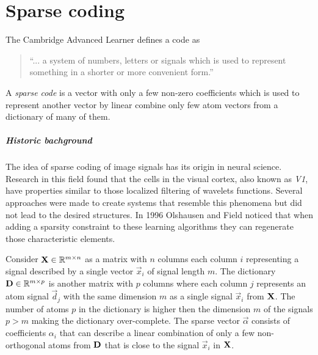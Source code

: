 \chapter{Sparse coding}
\label{chap:sparse_coding}

The Cambridge Advanced Learner defines a code as
\begin{quotation}
``... a system of numbers, letters or signals which is used to represent
something in a shorter or more convenient form.''
\end{quotation}
A \emph{sparse code} is a vector with only a few non-zero coefficients
which is used to represent another vector by linear combine only few atom
vectors from a dictionary of many of them.


\paragraph{Historic bachground}
The idea of sparse coding of image signals has its origin in neural science. 
Research in this field found that the cells in the visual cortex, also known as
\emph{V1}, have properties similar to those localized filtering of wavelets
functions. Several approaches were made to create systems that resemble this
phenomena but did not lead to the desired structures. In 1996 Olshausen and
Field\cite{Olshausen1996} noticed that when adding a sparsity constraint to
these learning algorithms they can regenerate those characteristic elements.

\newpage %
Consider $\boldsymbol{\mathrm{X}} \in \mathbb{R}^{m\times n}$  as a matrix with $n$ columns each
column $i$ representing a signal described by a single vector $\vec{x}_{i}$ of
signal length $m$. The dictionary $\boldsymbol{\mathrm{D}}\in\mathbb{R}^{m \times p}$ is another
matrix with $p$ columns where each column $j$ represents an atom signal
$\vec{d}_j$ with the same dimension $m$ as a single signal $\vec{x}_{i}$ from
$\boldsymbol{\mathrm{X}}$. The number of atoms $p$ in the dictionary is higher then the
dimension $m$ of the signals $p > m$ making the dictionary over-complete. The
sparse vector $\vec{\alpha}$ consists of coefficients $\alpha_i$ that can
describe a linear
combination of only a few non-orthogonal atoms from $\boldsymbol{\mathrm{D}}$ that is close to
the signal $\vec{x}_i $ in $\boldsymbol{\mathrm{X}}$. 

